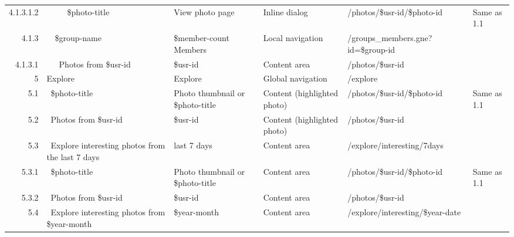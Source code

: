 \documentclass[12pt,a4paper]{article}
\begin{document}
\begin{landscape}
\begin{table}[h!b!p!]
\begin{center}
\begin{tiny}
\begin{tabular}{r|l|l|l|l|p{3cm}}
                    4.1.3.1.2 &
                    ~~~~~\$photo-title &
                    View photo page &
                    Inline dialog &
                    /photos/\$usr-id/\$photo-id &
                    Same as 1.1 \\

                4.1.3 &
                ~~\$group-name  &
                \$member-count Members &
                Local navigation &
                /groups\_members.gne?id=\$group-id &
                \\

                  4.1.3.1 &
                  ~~~Photos from \$usr-id &
                  \$usr-id &
                  Content area &
                  /photos/\$usr-id &
                  \\


            5 &
            Explore &
            Explore &
            Global navigation &
            /explore &
            \\

              5.1 &
              ~\$photo-title &
              Photo thumbnail or \$photo-title &
              Content (highlighted photo) &
              /photos/\$usr-id/\$photo-id &
              Same as 1.1 \\

              5.2 &
              ~Photos from \$usr-id &
              \$usr-id &
              Content (highlighted photo) &
              /photos/\$usr-id &
              \\

              5.3 &
              ~Explore interesting photos from the last 7 days &
              last 7 days &
              Content area &
              /explore/interesting/7days &
              \\

                5.3.1 &
                ~\$photo-title &
                Photo thumbnail or \$photo-title &
                Content area &
                /photos/\$usr-id/\$photo-id &
                Same as 1.1 \\

                5.3.2 &
                ~Photos from \$usr-id &
                \$usr-id &
                Content area &
                /photos/\$usr-id &
                \\

              5.4 &
              ~Explore interesting photos from \$year-month &
              \$year-month &
              Content area &
              /explore/interesting/\$year-date &
              \\


\end{tabular}
\end{tiny}
\end{center}
\end{table}
\end{landscape}
\end{document}

